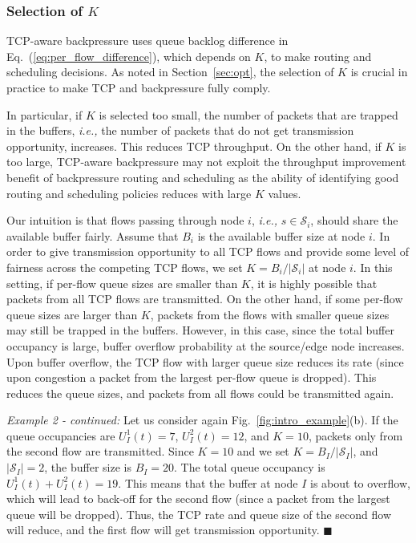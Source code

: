 \documentclass[conference]{IEEEtran}
\newcommand{\ie}{{\em i.e., }}
\newcommand{\Sset}{\mathcal{S}}
\begin{document}
\subsubsection{Selection of $K$}
TCP-aware backpressure uses queue backlog difference in Eq.~(\ref{eq:per_flow_difference}), which depends on $K$, to make routing and scheduling decisions. As noted in Section~\ref{sec:opt}, the selection of $K$ is crucial in practice to make TCP and backpressure fully comply.

In particular, if $K$ is selected too small, the number of packets that are trapped in the buffers, \ie the number of packets that do not get transmission opportunity, increases. This reduces TCP throughput. On the other hand, if $K$ is too large, TCP-aware backpressure may not exploit the throughput improvement benefit of backpressure routing and scheduling as the ability of identifying good routing and scheduling policies reduces with large $K$ values.



Our intuition is that flows passing through node $i$, \ie $s \in \Sset_{i}$, should share the available buffer fairly. Assume that $B_i$ is the available buffer size at node $i$. In order to give transmission opportunity to all TCP flows and provide some level of fairness across the competing TCP flows, we set $K = B_{i} / |\Sset_{i}|$ at node $i$. In this setting, if per-flow queue sizes are smaller than $K$, it is highly possible that packets from all TCP flows are transmitted. On the other hand, if some per-flow queue sizes are larger than $K$, packets from the flows with smaller queue sizes may still be trapped in the buffers. However, in this case, since the total buffer occupancy is large, buffer overflow probability at the source/edge node increases. Upon buffer overflow, the TCP flow with larger queue size reduces its rate (since upon congestion a packet from the largest per-flow queue is dropped). This reduces the queue sizes, and packets from all flows could be transmitted again.

{\em Example 2 - continued:} Let us consider again Fig.~\ref{fig:intro_example}(b). If the queue occupancies are $U_{I}^{1}(t) = 7$, $U_{I}^{2}(t) = 12$, and $K=10$, packets only from the second flow are transmitted. Since $K=10$ and we set $K = B_{I} / |\Sset_{I}|$, and $|\Sset_{I}|=2$, the buffer size is $B_{I}=20$. The total queue occupancy is  $U_{I}^{1}(t)+U_{I}^{2}(t)=19$. This means that the buffer at node $I$ is about to overflow, which will lead to back-off for the second flow (since a packet from the largest queue will be dropped). Thus, the TCP rate and queue size of the second flow will reduce, and the first flow will get transmission opportunity. \hfill $\blacksquare$
\end{document}

